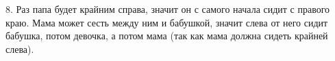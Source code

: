 8. Раз папа будет крайним справа, значит он с самого начала сидит с правого краю. Мама может сесть между ним и бабушкой, значит слева от него сидит бабушка, потом девочка, а потом мама (так как мама должна сидеть крайней слева).\\
